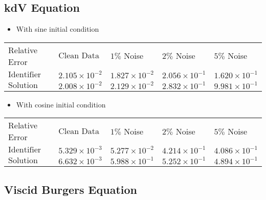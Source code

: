 \documentclass[12pt]{article}
\begin{document}
\newpage 

\subsection{kdV Equation}


\begin{itemize}
    \item With sine initial condition 
\end{itemize}
	\tabulinesep=4mm
	{ \large  }
	\vspace{3mm}
	\begin{tabu} to \linewidth { | X[c] | X[c] | X[c] | X[c] | X[c] | }
		 \hline
		\everyrow{\hline}
		Relative Error	& $\text{Clean Data}$ & $1 \%$ Noise & $2 \%$ Noise & $5 \%$ Noise \\
		$\text{Identifier}$ & $2.105 \times 10^{-2}$  & $1.827 \times 10^{-2}$   & $2.056 \times 10^{-1}$  & $1.620 \times 10^{-1}$ \\
		$\text{Solution}$ & $2.008 \times 10^{-2}$ &  $2.129 \times 10^{-2}$ & $2.832 \times 10^{-1}$    &  $9.981 \times 10^{-1}$  \\
	\end{tabu}
	
\begin{itemize}
    \item With cosine initial condition 
\end{itemize}
	\tabulinesep=4mm
	{ \large  }
	\vspace{3mm}
	\begin{tabu} to \linewidth { | X[c] | X[c] | X[c] | X[c] | X[c] | }
		 \hline
		\everyrow{\hline}
		Relative Error	& $\text{Clean Data}$ & $1 \%$ Noise & $2 \%$ Noise & $5 \%$ Noise \\
		$\text{Identifier}$ & $5.329 \times 10^{-3}$  & $5.277 \times 10^{-2}$   & $4.214 \times 10^{-1}$  & $4.086 \times 10^{-1}$ \\
		$\text{Solution}$ & $6.632 \times 10^{-3}$ &  $5.988 \times 10^{-1}$ & $5.252 \times 10^{-1}$    &  $4.894 \times 10^{-1}$  \\
	\end{tabu}
	
	
\subsection{Viscid Burgers Equation}
\end{document}
